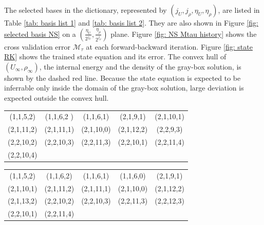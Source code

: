 The selected bases in the
dictionary, represented by $(j_U, j_{\rho}, \eta_U, \eta_\rho)$, are listed in Table 
\ref{tab: basis list 1} and \ref{tab: basis list 2}. 
They are also shown in Figure \ref{fig: selected basis NS} on a 
$(\frac{\eta_U}{2^{j_U}}, \frac{\eta_\rho}{2^{j_\rho}})$ plane.
Figure \ref{fig: NS Mtau history}
shows the cross validation error $\mathcal{M}_{\tau}$ at each forward-backward iteration.
Figure \ref{fig: state RK} shows the trained state equation and its error.
The convex hull of $({U}_\infty, \rho_\infty)$, the internal energy
and the density of the gray-box solution,
is shown by the dashed red line.
Because the state equation is expected to be inferrable only inside the domain of the gray-box 
solution, large deviation is expected outside the convex hull.\\


\begin{center}\begin{tabular}{ccccc}
(1,1,5,2)  &(1,1,6,2 )&(1,1,6,1) &(2,1,9,1)  & (2,1,10,1) \\
(2,1,11,2) &(2,1,11,1)&(2,1,10,0)&(2,1,12,2) & (2,2,9,3) \\
(2,2,10,2) &(2,2,10,3)&(2,2,11,3)&(2,2,10,1) & (2,2,11,4) \\
(2,2,10,4)&          &           &           &

\end{tabular}
\label{tab: basis list 1}
\end{center}


\begin{center}\begin{tabular}{ccccc}
(1,1,5,2)  & (1,1,6,2)  & (1,1,6,1)  & (1,1,6,0)  & (2,1,9,1) \\
(2,1,10,1) & (2,1,11,2) & (2,1,11,1) & (2,1,10,0) & (2,1,12,2)\\
(2,1,13,2) & (2,2,10,2) & (2,2,10,3) & (2,2,11,3) & (2,2,12,3)\\
(2,2,10,1) & (2,2,11,4) & & & 
\end{tabular}
\label{tab: basis list 2}\end{center}


